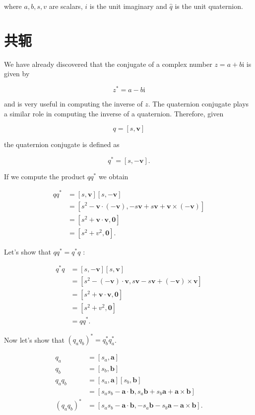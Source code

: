 where $a, b, s, v$ are scalars, $i$ is the unit imaginary and $\hat{q}$ is the unit quaternion.

\section{共轭}
We have already discovered that the conjugate of a complex number $z=a+b \mathrm{i}$ is given by

$$
z^{*}=a-b \mathrm{i}
$$

and is very useful in computing the inverse of $z$. The quaternion conjugate plays a similar role in computing the inverse of a quaternion. Therefore, given

$$
q=[s, \mathbf{v}]
$$

the quaternion conjugate is defined as

$$
q^{*}=[s,-\mathbf{v}] .
$$

If we compute the product $q q^{*}$ we obtain

$$
\begin{aligned}
q q^{*} & =[s, \mathbf{v}][s,-\mathbf{v}] \\
& =\left[s^{2}-\mathbf{v} \cdot(-\mathbf{v}),-s \mathbf{v}+s \mathbf{v}+\mathbf{v} \times(-\mathbf{v})\right] \\
& =\left[s^{2}+\mathbf{v} \cdot \mathbf{v}, \mathbf{0}\right] \\
& =\left[s^{2}+v^{2}, \mathbf{0}\right] .
\end{aligned}
$$

Let's show that $q q^{*}=q^{*} q$ :

$$
\begin{aligned}
q^{*} q & =[s,-\mathbf{v}][s, \mathbf{v}] \\
& =\left[s^{2}-(-\mathbf{v}) \cdot \mathbf{v}, s \mathbf{v}-s \mathbf{v}+(-\mathbf{v}) \times \mathbf{v}\right] \\
& =\left[s^{2}+\mathbf{v} \cdot \mathbf{v}, \mathbf{0}\right] \\
& =\left[s^{2}+v^{2}, \mathbf{0}\right] \\
& =q q^{*} .
\end{aligned}
$$

Now let's show that $\left(q_{a} q_{b}\right)^{*}=q_{b}^{*} q_{a}^{*}$.

$$
\begin{aligned}
q_{a} & =\left[s_{a}, \mathbf{a}\right] \\
q_{b} & =\left[s_{b}, \mathbf{b}\right] \\
q_{a} q_{b} & =\left[s_{a}, \mathbf{a}\right]\left[s_{b}, \mathbf{b}\right] \\
& =\left[s_{a} s_{b}-\mathbf{a} \cdot \mathbf{b}, s_{a} \mathbf{b}+s_{b} \mathbf{a}+\mathbf{a} \times \mathbf{b}\right] \\
\left(q_{a} q_{b}\right)^{*} & =\left[s_{a} s_{b}-\mathbf{a} \cdot \mathbf{b},-s_{a} \mathbf{b}-s_{b} \mathbf{a}-\mathbf{a} \times \mathbf{b}\right] .
\end{aligned}
$$

